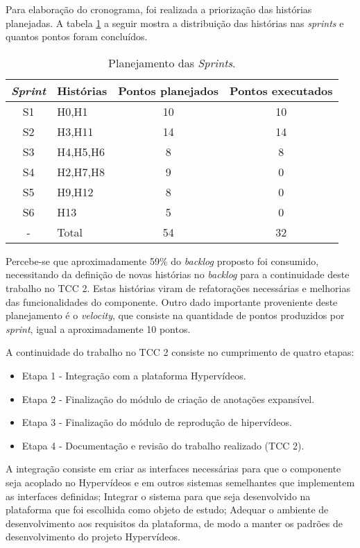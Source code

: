 Para elaboração do cronograma, foi realizada a priorização das histórias planejadas. A tabela \ref{tab:plan} a seguir mostra a distribuição das histórias nas \textit{sprints} e quantos pontos foram concluídos.

\begin{table}[h!]
	\centering
	\begin{tabular}{| c | p{4cm} | c | c |}
		\hline
		\textit{Sprint} & Histórias & Pontos planejados & Pontos executados \\
		\hline
		\hline
		S1 & H0,H1  & 10 & 10 \\
		\hline
		S2 & H3,H11 & 14 & 14 \\
		\hline		
		S3 & H4,H5,H6 & 8 & 8 \\
		\hline
		S4 & H2,H7,H8 & 9 & 0 \\
		\hline
		S5 & H9,H12 & 8 & 0 \\
		\hline
		S6 & H13 & 5 & 0 \\
		\hline
		- & Total & 54 & 32 \\
		\hline
	\end{tabular}
	\caption{Planejamento das \textit{Sprints}.}
	\label{tab:plan}
\end{table}

Percebe-se que aproximadamente 59\% do \textit{backlog} proposto foi consumido, necessitando da definição de novas histórias no \textit{backlog} para a continuidade deste trabalho no TCC 2. Estas histórias viram de refatorações necessárias e melhorias das funcionalidades do componente. Outro dado importante proveniente deste planejamento é o \textit{velocity}, que consiste na quantidade de pontos produzidos por \textit{sprint}, igual a aproximadamente 10 pontos.

A continuidade do trabalho no TCC 2 consiste no cumprimento de quatro etapas:

\begin{itemize}
	\item Etapa 1 - Integração com a plataforma Hypervídeos.
	\item Etapa 2 - Finalização do módulo de criação de anotações expansível.
	\item Etapa 3 - Finalização do módulo de reprodução de hipervídeos.
	\item Etapa 4 - Documentação e revisão do trabalho realizado (TCC 2).
\end{itemize}

A integração consiste em criar as interfaces necessárias para que o componente seja acoplado no Hypervídeos e em outros sistemas semelhantes que implementem as interfaces definidas; Integrar o sistema para que seja desenvolvido na plataforma que foi escolhida como objeto de estudo; Adequar o ambiente de desenvolvimento aos requisitos da plataforma, de modo a manter os padrões de desenvolvimento do projeto Hypervídeos.

